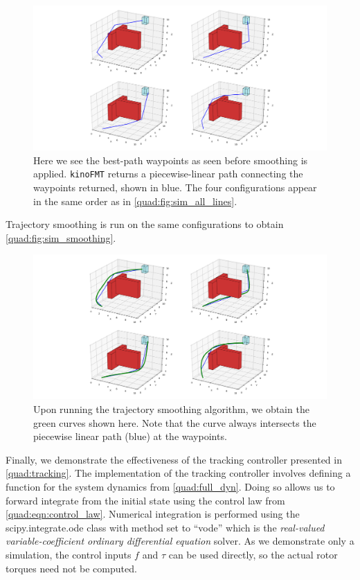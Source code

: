 \begin{figure}
    \centering
    \hspace*{-1.5cm}
    \includegraphics[scale=0.31]{./figures/sim_waypoints}
    \caption[Quadrotor simulation waypoints]{Here we see the best-path waypoints as seen before smoothing is applied. \texttt{kinoFMT} returns a piecewise-linear path connecting the waypoints returned, shown in blue. The four configurations appear in the same order as in \autoref{quad:fig:sim_all_lines}.}
\label{quad:fig:sim_waypoints}
\end{figure}

Trajectory smoothing is run on the same configurations to obtain \autoref{quad:fig:sim_smoothing}.

\begin{figure}
    \centering
    \hspace*{-1.5cm}
    \includegraphics[scale=0.31]{./figures/sim_smoothing}
    \caption[Quadrotor simulation smooth trajectory]{Upon running the trajectory smoothing algorithm, we obtain the green curves shown here. Note that the curve always intersects the piecewise linear path (blue) at the waypoints.}
\label{quad:fig:sim_smoothing}
\end{figure}

Finally, we demonstrate the effectiveness of the tracking controller presented in \autoref{quad:tracking}. The implementation of the tracking controller involves defining a function for the system dynamics from \autoref{quad:full_dyn}. Doing so allows us to forward integrate from the initial state using the control law from \autoref{quad:eqn:control_law}. Numerical integration is performed using the scipy.integrate.ode class with method set to ``vode'' which is the \emph{real-valued variable-coefficient ordinary differential equation} solver. As we demonstrate only a simulation, the control inputs $f$ and $\tau$ can be used directly, so the actual rotor torques need not be computed.

